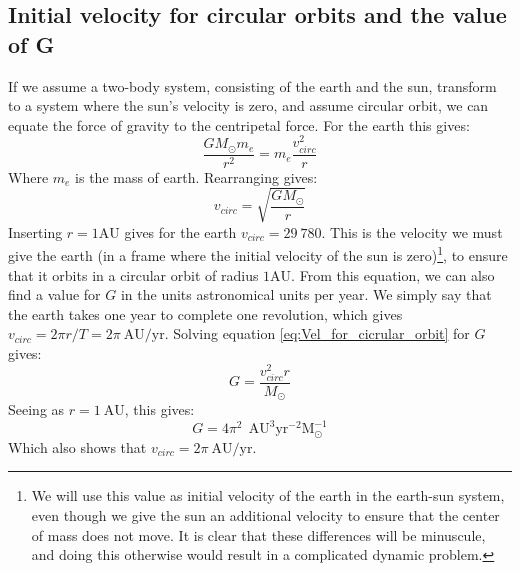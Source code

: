 \documentclass[a4paper, 10pt]{article}
\begin{document}
\begin{appendices}
\section{Initial velocity for circular orbits and the value of G}\label{ap:Find_Circular_orbit}
If we assume a two-body system, consisting of the earth and the sun, transform to a system where the sun's velocity is zero, and assume circular orbit, we can equate the force of gravity to the centripetal force. For the earth this gives:
$$\frac{GM_{\odot}m_e}{r^2}=m_e\frac{v_{circ}^2}{r}$$
Where $m_e$ is the mass of earth. Rearranging gives:
\begin{equation}\label{eq:Vel_for_cicrular_orbit}
v_{circ}=\sqrt{\frac{GM_{\odot}}{r}}
\end{equation}
Inserting $r=1 \mathrm{AU}$ gives for the earth $v_{circ}=29\ 780$. This is the velocity we must give the earth (in a frame where the initial velocity of the sun is zero)\footnote{We will use this value as initial velocity of the earth in the earth-sun system, even though we give the sun an additional velocity to ensure that the center of mass does not move. It is clear that these differences will be minuscule, and doing this otherwise would result in a complicated dynamic problem.}, to ensure that it orbits in a circular orbit of radius $1 \mathrm{AU}$. 
\linebreak
From this equation, we can also find a value for $G$ in the units astronomical units per year. We simply say that the earth takes one year to complete one revolution, which gives $v_{circ}=2\pi r/T=2\pi \ \mathrm{AU/yr}$. Solving equation \ref{eq:Vel_for_cicrular_orbit} for $G$ gives:
$$G=\frac{v_{circ}^2 r}{M_{\odot}}$$
Seeing as  $r=1 \ \mathrm{AU}$, this gives:
$$G=4\pi^2\ \ \mathrm{AU^3}\mathrm{yr^{-2}M_{\odot}^{-1}}$$
Which also shows that $v_{circ}=2\pi \ \mathrm{AU/yr}$.

\end{appendices}
\end{document}
